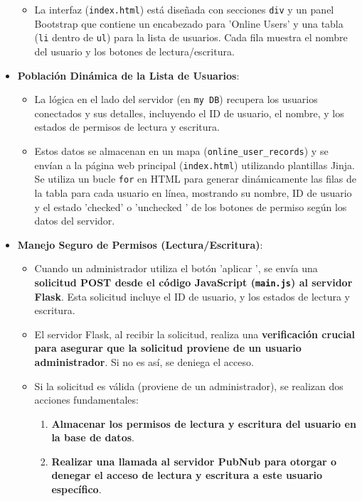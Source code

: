 \documentclass{report}
\begin{document}
\begin{itemize}
\begin{itemize}
        \item La interfaz (\verb|index.html|) está diseñada con secciones \verb|div| y un panel Bootstrap que contiene un encabezado para  'Online Users' 
        y una tabla (\texttt{li} dentro de \texttt{ul}) para la lista de usuarios. Cada fila muestra el nombre del usuario y los botones de lectura/escritura.
    \end{itemize}
    \item \textbf{Población Dinámica de la Lista de Usuarios}:
    \begin{itemize}
        \item La lógica en el lado del servidor (en \texttt{my DB}) recupera los usuarios conectados y sus detalles, incluyendo el ID de usuario, el nombre, 
        y los estados de permisos de lectura y escritura.
        \item Estos datos se almacenan en un mapa (\verb|online_user_records|) y se envían a la página web principal (\verb|index.html|) utilizando 
        plantillas Jinja. Se utiliza un bucle \texttt{for} en HTML para generar dinámicamente las filas de la tabla para cada usuario en línea, mostrando 
        su nombre, ID de usuario y el estado 'checked' o  'unchecked ' de los botones de permiso según los datos del servidor.
    \end{itemize}
    \item \textbf{Manejo Seguro de Permisos (Lectura/Escritura)}:
    \begin{itemize}
        \item Cuando un administrador utiliza el botón  'aplicar ', se envía una \textbf{solicitud POST desde el código JavaScript 
        (\texttt{main.js}) al servidor Flask}. Esta solicitud incluye el ID de usuario, y los estados de lectura y escritura.
        \item El servidor Flask, al recibir la solicitud, realiza una \textbf{verificación crucial para asegurar que la solicitud proviene de un 
        usuario administrador}. Si no es así, se deniega el acceso.
        \item Si la solicitud es válida (proviene de un administrador), se realizan dos acciones fundamentales:
        \begin{enumerate}
            \item \textbf{Almacenar los permisos de lectura y escritura del usuario en la base de datos}.
            \item \textbf{Realizar una llamada al servidor PubNub para otorgar o denegar el acceso de lectura y escritura a este usuario específico}.

\end{enumerate}
\end{itemize}
\end{itemize}
\end{document}
